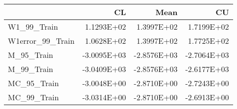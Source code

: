 \begin{tabular}{lrrr}
\toprule
{} &          CL &        Mean &          CU \\
\midrule
W1\_99\_Train      &  1.1293E+02 &  1.3997E+02 &  1.7199E+02 \\
W1error\_99\_Train &  1.0628E+02 &  1.3997E+02 &  1.7725E+02 \\
M\_95\_Train       & -3.0095E+03 & -2.8576E+03 & -2.7064E+03 \\
M\_99\_Train       & -3.0409E+03 & -2.8576E+03 & -2.6177E+03 \\
MC\_95\_Train      & -3.0048E+00 & -2.8710E+00 & -2.7243E+00 \\
MC\_99\_Train      & -3.0314E+00 & -2.8710E+00 & -2.6913E+00 \\
\bottomrule
\end{tabular}
